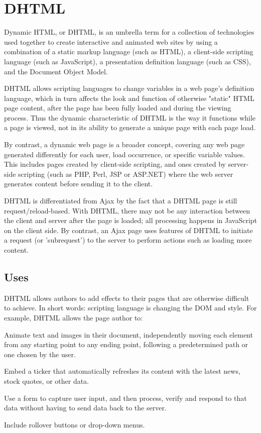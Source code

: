 \part{DHTML}


Dynamic HTML, or DHTML, is an umbrella term for a collection of technologies used together to create interactive and animated web sites by using a combination of a static markup language (such as HTML), a client-side scripting language (such as JavaScript), a presentation definition language (such as CSS), and the Document Object Model.

DHTML allows scripting languages to change variables in a web page's definition language, which in turn affects the look and function of otherwise "static" HTML page content, after the page has been fully loaded and during the viewing process. Thus the dynamic characteristic of DHTML is the way it functions while a page is viewed, not in its ability to generate a unique page with each page load.

By contrast, a dynamic web page is a broader concept, covering any web page generated differently for each user, load occurrence, or specific variable values. This includes pages created by client-side scripting, and ones created by server-side scripting (such as PHP, Perl, JSP or ASP.NET) where the web server generates content before sending it to the client.

DHTML is differentiated from Ajax by the fact that a DHTML page is still request/reload-based. With DHTML, there may not be any interaction between the client and server after the page is loaded; all processing happens in JavaScript on the client side. By contrast, an Ajax page uses features of DHTML to initiate a request (or 'subrequest') to the server to perform actions such as loading more content.



\chapter{Uses}


DHTML allows authors to add effects to their pages that are otherwise difficult to achieve. In short words: scripting language is changing the DOM and style. For example, DHTML allows the page author to:


\begin{compactitem}
\item Animate text and images in their document, independently moving each element from any starting point to any ending point, following a predetermined path or one chosen by the user.

\item Embed a ticker that automatically refreshes its content with the latest news, stock quotes, or other data.

\item Use a form to capture user input, and then process, verify and respond to that data without having to send data back to the server.

\item Include rollover buttons or drop-down menus.

\end{compactitem}

